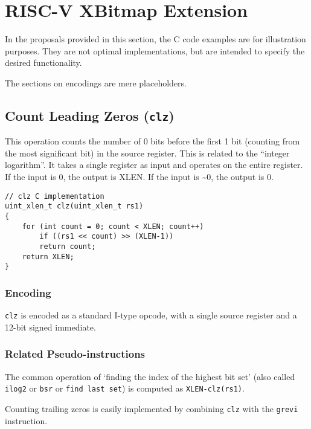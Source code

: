 \chapter{RISC-V XBitmap Extension}\label{risc-v-b-hardware-instructions}

In the proposals provided in this section, the C code examples are for
illustration purposes. They are not optimal implementations, but are
intended to specify the desired functionality.

The sections on encodings are mere placeholders.


\section{Count Leading Zeros (\texttt{clz})}

This operation counts the number of 0 bits before the first 1 bit
(counting from the most significant bit) in the source register. This is
related to the ``integer logarithm''. It takes a single register as
input and operates on the entire register. If the input is 0, the output is
XLEN. If the input is \textasciitilde{}0, the output is 0.

\begin{verbatim}
// clz C implementation
uint_xlen_t clz(uint_xlen_t rs1)
{
    for (int count = 0; count < XLEN; count++)
        if ((rs1 << count) >> (XLEN-1))
	    return count;
    return XLEN;
}
\end{verbatim}

\subsection{Encoding}



\texttt{clz} is encoded as a standard I-type opcode, with a single
source register and a 12-bit signed immediate.

\subsection{Related Pseudo-instructions}

The common operation of `finding the index of the highest bit set' (also called
\texttt{ilog2} or \texttt{bsr} or \texttt{find\ last\ set}) is computed as
\texttt{XLEN-clz(rs1)}.

Counting trailing zeros is easily implemented by combining \texttt{clz} with
the \texttt{grevi} instruction.

